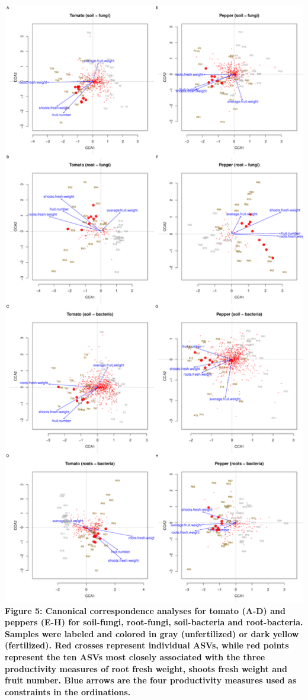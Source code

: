 \documentclass[11pt,]{article}
\begin{document}
\includegraphics{../figures/Figure6_rda.pdf}\\
\textbf{Figure 5: Canonical correspondence analyses for tomato (A-D) and
peppers (E-H) for soil-fungi, root-fungi, soil-bacteria and
root-bacteria. Samples were labeled and colored in gray (unfertilized)
or dark yellow (fertilized). Red crosses represent individual ASVs,
while red points represent the ten ASVs most closely associated with the
three productivity measures of root fresh weight, shoots fresh weight
and fruit number. Blue arrows are the four productivity measures used as
constraints in the ordinations.} ~\\
\end{document}
